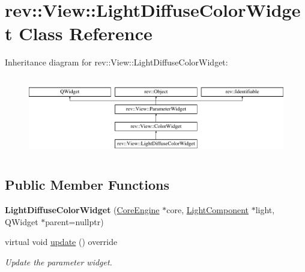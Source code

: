 \hypertarget{classrev_1_1_view_1_1_light_diffuse_color_widget}{}\section{rev\+::View\+::Light\+Diffuse\+Color\+Widget Class Reference}
\label{classrev_1_1_view_1_1_light_diffuse_color_widget}
Inheritance diagram for rev\+::View\+::Light\+Diffuse\+Color\+Widget\+:\begin{figure}[H]
\begin{center}
\leavevmode
\includegraphics[height=3.472868cm]{classrev_1_1_view_1_1_light_diffuse_color_widget}
\end{center}
\end{figure}
\subsection*{Public Member Functions}
\begin{DoxyCompactItemize}
\item 
\mbox{\label{classrev_1_1_view_1_1_light_diffuse_color_widget_af3dc80f102f03ba5b5f7251de0196106}} 
{\bfseries Light\+Diffuse\+Color\+Widget} (\mbox{\hyperlink{classrev_1_1_core_engine}{Core\+Engine}} $\ast$core, \mbox{\hyperlink{classrev_1_1_light_component}{Light\+Component}} $\ast$light, Q\+Widget $\ast$parent=nullptr)
\item 
\mbox{\label{classrev_1_1_view_1_1_light_diffuse_color_widget_a537649237afeba308af3126938537cfe}} 
virtual void \mbox{\hyperlink{classrev_1_1_view_1_1_light_diffuse_color_widget_a537649237afeba308af3126938537cfe}{update}} () override
\begin{DoxyCompactList}\small\item\em Update the parameter widget. \end{DoxyCompactList}\end{DoxyCompactItemize}
